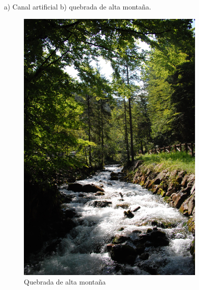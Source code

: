 \documentclass[11pt, oneside]{article}
\begin{document}
\begin{figure}[h]
\centering
\caption{a) Canal artificial b) quebrada de alta montaña.}
\label{fig2}
\end{figure}

\begin{figure}
     \centering
     \begin{subfigure}[b]{0.45\textwidth}
         \centering
         \includegraphics[width=\textwidth]{fig2a}
         \caption{Quebrada de alta montaña}
         \label{fig2a}
     \end{subfigure}
     \hfill
     \begin{subfigure}[b]{0.45\textwidth}
         \centering

\end{subfigure}
\end{figure}
\end{document}
